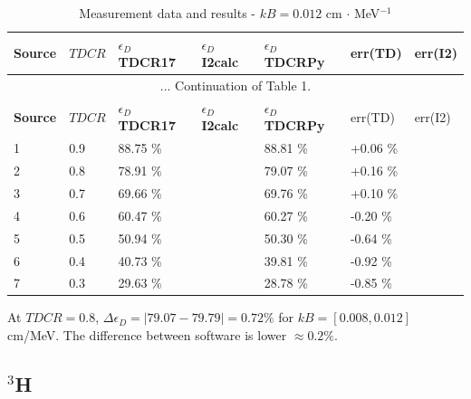 \documentclass[12pt]{iopart}
\begin{document}
\begingroup
\footnotesize
\begin{longtable}[l]{| p{} | p{} |p{} |p{} |p{} |p{} |p{} |} 
\caption{Measurement data and results - $kB = 0.012$ cm $\cdot$ MeV$^{-1}$}
\label{Table1} \\ 
\hline
\textbf{Source} & \textbf{$TDCR$} & \textbf{$\epsilon_{D}$ TDCR17} & \textbf{$\epsilon_{D}$ I2calc} & \textbf{$\epsilon_{D}$ TDCRPy} & err(TD)& err(I2) \\ 
\endfirsthead
\multicolumn{7}{c}{... Continuation of Table 1.}\\ 
\hline
 \textbf{Source} & \textbf{$TDCR$} & \textbf{$\epsilon_{D}$ TDCR17} & \textbf{$\epsilon_{D}$ I2calc} & \textbf{$\epsilon_{D}$ TDCRPy} & err(TD)& err(I2) \\   \hline 
\endhead
\hline
 1 & 0.9   &   88.75 \% &  & 88.81 \% & +0.06 \% & \\
 2 & 0.8   &   78.91 \% &  & 79.07 \% & +0.16 \% & \\
 3 & 0.7   &   69.66 \% &  & 69.76 \% & +0.10 \% & \\
 4 & 0.6   &   60.47 \% &  & 60.27 \% & -0.20 \% & \\
 5 & 0.5   &   50.94 \% &  & 50.30 \% & -0.64 \% & \\
 6 & 0.4   &   40.73 \% &  & 39.81 \% & -0.92 \% & \\
 7 & 0.3   &   29.63 \% &  & 28.78 \% & -0.85 \% & \\
\hline
\end{longtable} 
\endgroup

At $TDCR = 0.8$, $\Delta \epsilon_D = |79.07 - 79.79| = 0.72 \%$ for $kB = [0.008, 0.012]$ cm/MeV. The difference between software is lower $\approx 0.2 \%$. 

\pagebreak
\subsection{$^{3}$H}
\end{document}
